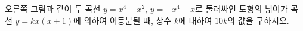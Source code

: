 \noindent\begin{minipage}[t]{0.58\linewidth}\vspace{0pt}\raggedright 오른쪽 그림과 같이 두 곡선 $y=x^4-x^2$, $y=-x^4-x$로 둘러싸인 도형의 넓이가 곡선 $y=kx(x+1)$에 의하여 이등분될 때, 상수 $k$에 대하여 $10k$의 값을 구하시오. \end{minipage}\hfill\begin{minipage}[t]{0.4\linewidth}\vspace{0pt}\centering \resizebox{\ifdim\width>\linewidth\linewidth\else\width\fi}{!}{}\end{minipage}\par
